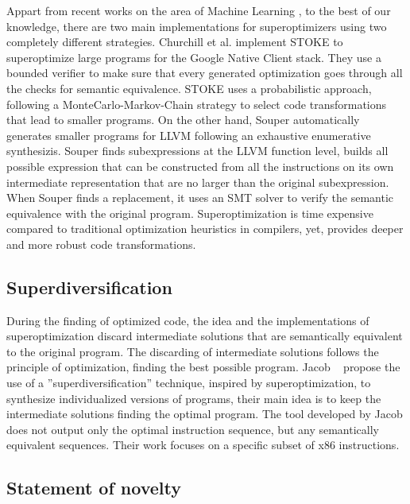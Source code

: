 Appart from recent works on the area of Machine Learning \cite{2021arXiv210913498S}, to the best of our knowledge, there are two main implementations for superoptimizers using two completely different strategies.
Churchill et al. \cite{churchill_sound_nodate} implement STOKE \cite{bansal_automatic_nodate} to superoptimize large programs for the  Google Native Client stack. They use a bounded verifier to make sure that every generated optimization goes through all the checks for semantic equivalence. STOKE uses a probabilistic approach, following a MonteCarlo-Markov-Chain strategy to select code transformations that lead to smaller programs.
On the other hand, Souper \cite{bansal_automatic_nodate} automatically generates smaller programs for LLVM following an exhaustive enumerative synthesizis. Souper finds subexpressions at the LLVM function level, builds all possible expression that can be constructed from all the instructions on its own intermediate representation that are no larger than the original subexpression. When Souper finds a replacement, it uses an SMT solver \cite{SMT_solver} to verify the semantic equivalence with the original program. 
Superoptimization is time expensive compared to traditional optimization heuristics in compilers, yet, provides deeper and more robust code transformations.


\subsection*{Superdiversification}

During the finding of optimized code, the idea and the implementations of superoptimization discard intermediate solutions that are semantically equivalent to the original program. The discarding of intermediate solutions follows the principle of optimization, finding the best possible program. Jacob \etal~\cite{jacob2008superdiversifier} propose the use of a ''superdiversification'' technique, inspired by superoptimization,
to synthesize individualized versions of programs, their main idea is to keep the intermediate solutions finding the optimal program.
The tool developed by Jacob \etal does not output only the optimal instruction sequence, but any semantically equivalent sequences.
Their work focuses on a specific subset of x86 instructions.



\subsection*{Statement of novelty}

